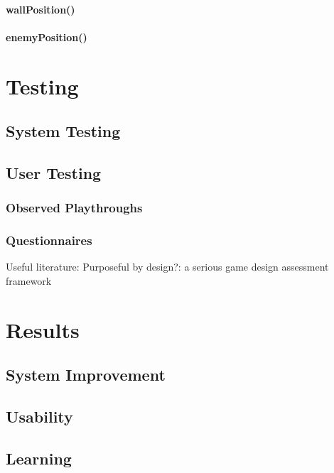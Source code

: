 \documentclass[a4paper,11.5pt]{report}
\numberwithin{figure}{section}
\numberwithin{table}{section}
\numberwithin{equation}{section}
\numberwithin{equation}{section}
\newcommand\blankpage{%
    \null
    \thispagestyle{empty}%
    \addtocounter{page}{-1}%
    \newpage}
\begin{document}
\subsubsection*{wallPosition()}

\subsubsection*{enemyPosition()}

\afterpage{\blankpage}




\chapter{Testing}

\section{System Testing}

\section{User Testing}
\subsection{Observed Playthroughs} %
\subsection{Questionnaires}

Useful literature:
Purposeful by design?: a serious game design assessment framework

\afterpage{\blankpage}




\chapter{Results}

\section{System Improvement}

\section{Usability}

\section{Learning}
\end{document}
